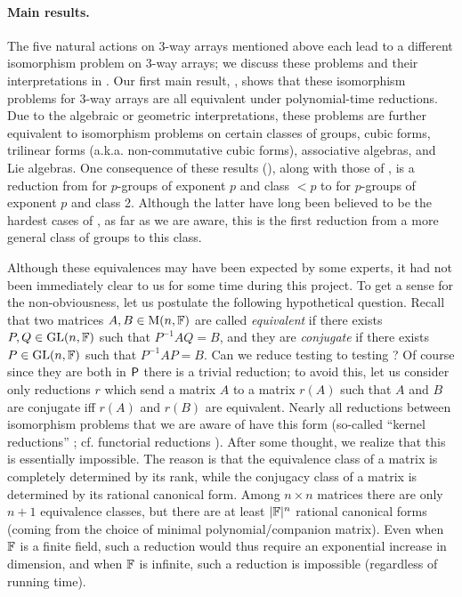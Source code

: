 \paragraph{Main results.} 
The five natural actions on 3-way arrays mentioned above each lead to a different 
isomorphism problem on 3-way arrays; we discuss these problems and their 
interpretations in . 
Our first main result, , shows that these 
isomorphism problems for 3-way arrays are all equivalent under 
polynomial-time reductions. Due to the 
algebraic or geometric interpretations, these problems are further 
equivalent to isomorphism problems on certain classes of groups, 
cubic forms, trilinear forms (a.k.a. non-commutative cubic forms), 
associative algebras, and Lie algebras. 
One consequence of these results (), along with those of \cite{FGS19}, is a reduction 
from \GpI for $p$-groups of exponent $p$ and class $< p$ to \GpI for $p$-groups of 
exponent $p$ and class 2. Although the latter have long been believed to be the 
hardest cases of \GpI, as far as we are aware, this is the first reduction from a 
more general class of groups to this class.

Although these equivalences may have been expected by some experts, it had not been 
immediately clear to us for some time during this project. 
To get a sense for the non-obviousness, let us postulate  the following hypothetical question. 
Recall that two matrices $A, B\in \mathrm{M}(n, \mathbb{F})$ are called \emph{equivalent} if 
there exists $P, Q\in\mathrm{GL}(n, \mathbb{F})$ such that $P^{-1}AQ=B$, and they are \emph{conjugate} if 
there 
exists $P\in \mathrm{GL}(n,\mathbb{F})$ such that $P^{-1}AP=B$. Can we reduce testing 
to testing ? Of course since they are both in 
$\mathsf{P}$ there is a trivial reduction; to avoid this, let us consider only 
reductions $r$ which send a matrix $A$ to a matrix $r(A)$ such that $A$ and $B$ 
are conjugate iff $r(A)$ and $r(B)$ are equivalent. Nearly all reductions between 
isomorphism problems that we are aware of have this form (so-called ``kernel 
reductions'' \cite{FortnowGrochowPEq}; 
cf. functorial reductions \cite{BabaiSR}). 
After some thought, we realize that this is essentially 
impossible. The reason is that the equivalence class of a matrix is completely determined by its 
rank, while the conjugacy class of a matrix is determined by its rational canonical form. Among $n \times n$ matrices there are only $n+1$ equivalence classes, but there are at least $|\mathbb{F}|^n$ rational canonical forms (coming from the choice of minimal polynomial/companion matrix). Even when $\mathbb{F}$ is a finite field, such a reduction would thus require an exponential increase in dimension, and when $\mathbb{F}$ is infinite, such a reduction is impossible (regardless of running time).


